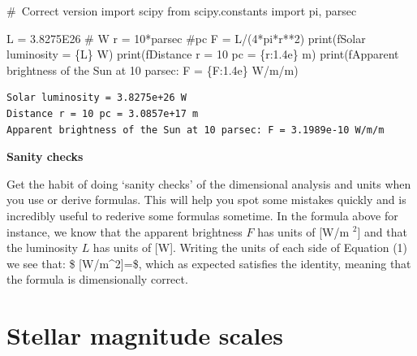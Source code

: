 \documentclass[
  letterpaper,
  DIV=11,
  numbers=noendperiod]{scrreprt}
\newenvironment{Shaded}{\begin{snugshade}}{\end{snugshade}}
\newcommand{\BuiltInTok}[1]{\textcolor[rgb]{0.00,0.23,0.31}{#1}}
\newcommand{\CommentTok}[1]{\textcolor[rgb]{0.37,0.37,0.37}{#1}}
\newcommand{\DecValTok}[1]{\textcolor[rgb]{0.68,0.00,0.00}{#1}}
\newcommand{\FloatTok}[1]{\textcolor[rgb]{0.68,0.00,0.00}{#1}}
\newcommand{\ImportTok}[1]{\textcolor[rgb]{0.00,0.46,0.62}{#1}}
\newcommand{\NormalTok}[1]{\textcolor[rgb]{0.00,0.23,0.31}{#1}}
\newcommand{\OperatorTok}[1]{\textcolor[rgb]{0.37,0.37,0.37}{#1}}
\newcommand{\SpecialCharTok}[1]{\textcolor[rgb]{0.37,0.37,0.37}{#1}}
\newcommand{\SpecialStringTok}[1]{\textcolor[rgb]{0.13,0.47,0.30}{#1}}
\begin{document}
\begin{Shaded}
\begin{Highlighting}[]
\CommentTok{\# Correct version}
\ImportTok{import}\NormalTok{ scipy}
\ImportTok{from}\NormalTok{ scipy.constants }\ImportTok{import}\NormalTok{ pi, parsec}

\NormalTok{L }\OperatorTok{=} \FloatTok{3.8275E26} \CommentTok{\# W}
\NormalTok{r }\OperatorTok{=} \DecValTok{10}\OperatorTok{*}\NormalTok{parsec }\CommentTok{\#pc}
\NormalTok{F }\OperatorTok{=}\NormalTok{ L}\OperatorTok{/}\NormalTok{(}\DecValTok{4}\OperatorTok{*}\NormalTok{pi}\OperatorTok{*}\NormalTok{r}\OperatorTok{**}\DecValTok{2}\NormalTok{)}
\BuiltInTok{print}\NormalTok{(}\SpecialStringTok{f\textquotesingle{}Solar luminosity = }\SpecialCharTok{\{}\NormalTok{L}\SpecialCharTok{\}}\SpecialStringTok{ W\textquotesingle{}}\NormalTok{)}
\BuiltInTok{print}\NormalTok{(}\SpecialStringTok{f\textquotesingle{}Distance r = 10 pc = }\SpecialCharTok{\{}\NormalTok{r}\SpecialCharTok{:1.4e\}}\SpecialStringTok{ m\textquotesingle{}}\NormalTok{)}
\BuiltInTok{print}\NormalTok{(}\SpecialStringTok{f\textquotesingle{}Apparent brightness of the Sun at 10 parsec: F = }\SpecialCharTok{\{}\NormalTok{F}\SpecialCharTok{:1.4e\}}\SpecialStringTok{ W/m/m\textquotesingle{}}\NormalTok{)}
\end{Highlighting}
\end{Shaded}

\begin{verbatim}
Solar luminosity = 3.8275e+26 W
Distance r = 10 pc = 3.0857e+17 m
Apparent brightness of the Sun at 10 parsec: F = 3.1989e-10 W/m/m
\end{verbatim}

\textbf{Sanity checks}

Get the habit of doing `sanity checks' of the dimensional analysis and
units when you use or derive formulas. This will help you spot some
mistakes quickly and is incredibly useful to rederive some formulas
sometime. In the formula above for instance, we know that the apparent
brightness \(F\) has units of {[}W/m \(^2\){]} and that the luminosity
\(L\) has units of {[}W{]}. Writing the units of each side of Equation
(1) we see that: \$ {[}W/m\^{}2{]}=\dfrac{[W]}{[m^2]}\$, which as
expected satisfies the identity, meaning that the formula is
dimensionally correct.

\hypertarget{stellar-magnitude-scales}{%
\section{Stellar magnitude scales}\label{stellar-magnitude-scales}}
\end{document}
